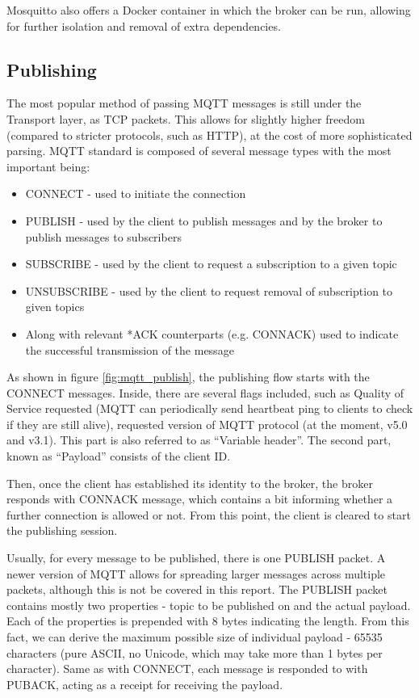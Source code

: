 Mosquitto also offers a Docker container \cite{light2017mosquitto} in which the broker can be run, allowing for further isolation and removal of extra dependencies.

\subsection{Publishing}\label{sec:pub}

The most popular method of passing MQTT messages is still under the Transport layer, as TCP packets. This allows for slightly higher freedom (compared to stricter protocols, such as HTTP), at the cost of more sophisticated parsing. MQTT standard is composed of several message types with the most important being:
\begin{itemize}
  \item CONNECT - used to initiate the connection
  \item PUBLISH - used by the client to publish messages and by the broker to publish messages to subscribers
  \item SUBSCRIBE - used by the client to request a subscription to a given topic
  \item UNSUBSCRIBE - used by the client to request removal of subscription to given topics
  \item Along with relevant *ACK counterparts (e.g. CONNACK) used to indicate the successful transmission of the message
\end{itemize}
As shown in figure \ref{fig:mqtt_publish}, the publishing flow starts with the CONNECT messages. Inside, there are several flags included, such as Quality of Service requested (MQTT can periodically send heartbeat ping to clients to check if they are still alive), requested version of MQTT protocol (at the moment, v5.0 and v3.1). This part is also referred to as ``Variable header''. The second part, known as ``Payload'' consists of the client ID.

Then, once the client has established its identity to the broker, the broker responds with CONNACK message, which contains a bit informing whether a further connection is allowed or not. From this point, the client is cleared to start the publishing session.

Usually, for every message to be published, there is one PUBLISH packet. A newer version of MQTT allows for spreading larger messages across multiple packets, although this is not be covered in this report. The PUBLISH packet contains mostly two properties - topic to be published on and the actual payload. Each of the properties is prepended with 8 bytes indicating the length. From this fact, we can derive the maximum possible size of individual payload - 65535 characters (pure ASCII, no Unicode, which may take more than 1 bytes per character). Same as with CONNECT, each message is responded to with PUBACK, acting as a receipt for receiving the payload.

